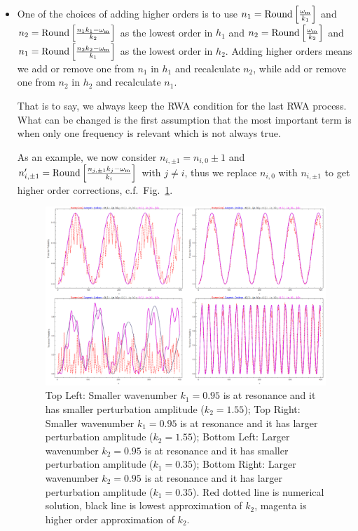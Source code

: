 \begin{itemize}
    \item One of the choices of adding higher orders is to use $n_1=\mathrm{Round}\left[ \frac{\omega_\mathrm m}{k_1} \right]$ and $n_2=\mathrm{Round}\left[ \frac{ n_1  k_1 - \omega_\mathrm m }{k_2} \right]$ as the lowest order in $h_1$ and $n_2=\mathrm{Round}\left[ \frac{\omega_\mathrm m}{k_2} \right]$ and $n_1=\mathrm{Round}\left[ \frac{ n_2  k_2 - \omega_\mathrm m }{k_1} \right]$ as the lowest order in $h_2$. Adding higher orders means we add or remove one from $n_1$ in $h_1$ and recalculate $n_2$, while add or remove one from $n_2$ in $h_2$ and recalculate $n_1$.

   That is to say, we always keep the RWA condition for the last RWA process. What can be changed is the first assumption that the most important term is when only one frequency is relevant which is not always true.

   As an example, we now consider $n_{i,\pm 1}=n_{i,0}\pm 1$ and $n'_{i,\pm 1} =  \mathrm{Round}\left[ \frac{ n_{j,\pm 1} k_j - \omega_\mathrm m }{k_i} \right]$ with $j\neq i$, thus we replace $n_{i,0}$ with $n_{i,\pm 1}$ to get higher order corrections, c.f.~Fig.~\ref{chap:matter-sec:jacobi-subsec:multi-matter-freq-fig:compApproxNum}.


\begin{figure}[!htbp]
    \centering
    \includegraphics[width=\textwidth]{chapters/assets/rabi/compApproxNum.png}
    \caption{Top Left: Smaller wavenumber $k_1=0.95$ is at resonance and it has smaller perturbation amplitude ($k_2=1.55$);
      Top Right: Smaller wavenumber $k_1=0.95$ is at resonance and it has larger perturbation amplitude ($k_2=1.55$);
      Bottom Left: Larger wavenumber $k_2=0.95$ is at resonance and it has smaller perturbation amplitude ($k_1=0.35$);
      Bottom Right: Larger wavenumber $k_2=0.95$ is at resonance and it has larger perturbation amplitude ($k_1=0.35$).
      Red dotted line is numerical solution, black line is lowest approximation of $k_2$, magenta is higher order approximation of $k_2$.}
    \label{chap:matter-sec:jacobi-subsec:multi-matter-freq-fig:compApproxNum}
\end{figure}


\end{itemize}
